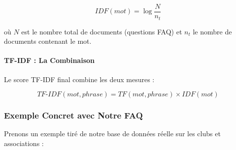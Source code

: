 \documentclass[11pt,a4paper]{article}
\begin{document}
\[
IDF(mot) = \log \frac{N}{n_t}
\]

où $N$ est le nombre total de documents (questions FAQ) et $n_t$ le nombre de documents contenant le mot.

\paragraph{TF-IDF : La Combinaison}

Le score TF-IDF final combine les deux mesures :

\[
TF\text{-}IDF(mot, phrase) = TF(mot, phrase) \times IDF(mot)
\]

\subsubsection{Exemple Concret avec Notre FAQ}

Prenons un exemple tiré de notre base de données réelle sur les clubs et associations :
\end{document}
